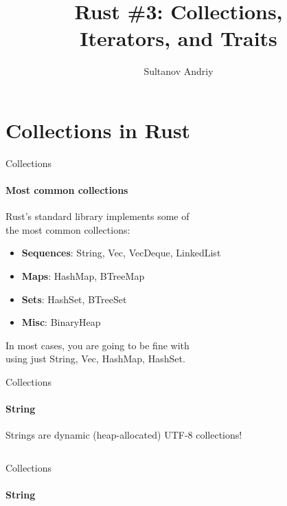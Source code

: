 \documentclass[usenames,dvipsnames,10pt,aspectratio=169]{beamer}
\title[Rust \#3]{Rust \#3: Collections,\\ \vspace{0.1cm}
Iterators, and Traits}
\author[Sultanov Andriy]{Sultanov Andriy}
\institute{APPS@UCU}
\begin{document}
\begin{frame}
\titlepage
\end{frame}

\begin{frame}{\contentsname}
\tableofcontents
\end{frame}


\section{Collections in Rust}

\begin{frame}{Collections}
	\framesubtitle{Most common collections}
	\large
	Rust's standard library implements some of\\
	the most common collections:
\begin{itemize}[label=$\bullet$]
	\item \textbf{Sequences}: \textcolor{ucuyellow}{String}, 
	\textcolor{ucuyellow}{Vec}, 
		\textcolor{ucuyellow}{VecDeque}, \textcolor{ucuyellow}{LinkedList}
	\item \textbf{Maps}: \textcolor{ucuyellow}{HashMap}, \textcolor{ucuyellow}{BTreeMap}
	\item \textbf{Sets}: \textcolor{ucuyellow}{HashSet}, \textcolor{ucuyellow}{BTreeSet}
	\item \textbf{Misc}: \textcolor{ucuyellow}{BinaryHeap}
\end{itemize}

	\vspace{0.4cm}
	In most cases, you are going to be fine with\\
	using just \textcolor{ucuyellow}{String}, \textcolor{ucuyellow}{Vec}, 
	\textcolor{ucuyellow}{HashMap}, \textcolor{ucuyellow}{HashSet}.
\end{frame}

\begin{frame}{Collections}
	\framesubtitle{String}
	\large
	Strings are dynamic (heap-allocated) UTF-8 collections!
	\vspace{0.3cm}
	\inputminted[fontsize=\large]{rust}{code/string.rs}
	\vspace{0.3cm}
\end{frame}

\begin{frame}{Collections}
	\framesubtitle{String}
	\large
	\inputminted[fontsize=\large]{rust}{code/string1.rs}
	\vspace{0.3cm}
\end{frame}
\end{document}
